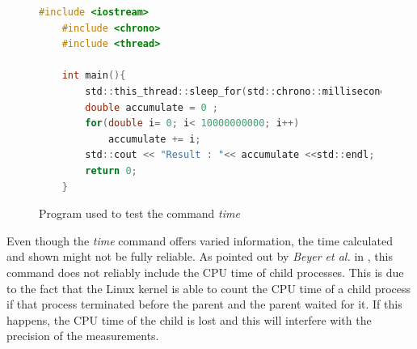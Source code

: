 \begin{figure}[h]
\begin{lstlisting}[language=c]
    #include <iostream>
    #include <chrono>
    #include <thread>
    
    int main(){
        std::this_thread::sleep_for(std::chrono::milliseconds(1000));
        double accumulate = 0 ;
        for(double i= 0; i< 10000000000; i++)
            accumulate += i;
        std::cout << "Result : "<< accumulate <<std::endl;  
        return 0;
    }
\end{lstlisting}
\caption{Program used to test the command \textit{time}}
\label{fig:time_code_cpp}
\end{figure}


Even though the \textit{time} command offers varied information, the time calculated and shown might not be fully reliable. As pointed out by \textit{Beyer et al.} in \cite{Beyer2017ReliableBR}, this command does not reliably include the CPU time of child processes. This is due to the fact that the Linux kernel is able to count the CPU time of a child process if that process terminated before the parent and the parent waited for it. If this happens, the CPU time of the child is lost and this will interfere with the precision of the measurements.\cite{Beyer2017ReliableBR}\\ \hfill

